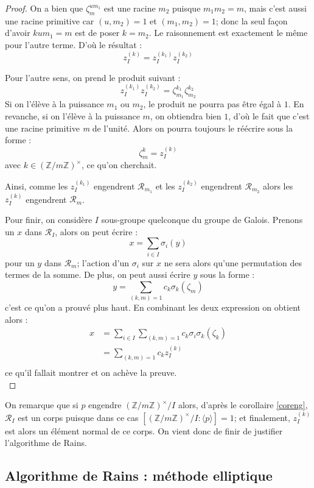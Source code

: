 \documentclass[a4paper]{article} %
\numberwithin{equation}{section}
\newcommand\nroot[1]{\textit{#1}\up{\textit{ième}}}
\newcommand\zmodninv[1]{(\mathbb{Z}/#1\mathbb{Z})^{\times}}
\begin{document}
\begin{proof}
On a bien que $\zeta_m^{um_1}$ est une racine \nroot{$m_2$} puisque $m_1m_2 = m$, mais c'est aussi une racine primitive car $(u,m_2) = 1$ et $(m_1, m_2) = 1$; donc la seul façon d'avoir $kum_1 = m$ est de poser $k = m_2$. Le raisonnement est exactement le même pour l'autre terme. D'où le résultat :
\[z_I^{(k)} = z_I^{(k_1)}z_I^{(k_2)}\]\par
Pour l'autre sens, on prend le produit suivant :
\[z_I^{(k_1)}z_I^{(k_2)} = \zeta_{m_1}^{k_1}\zeta_{m_2}^{k_2}\]
Si on l'élève à la puissance $m_1$ ou $m_2$, le produit ne pourra pas être égal à $1$. En revanche, si on l'élève à la puissance $m$, on obtiendra bien $1$, d'où le fait que c'est une racine primitive \nroot{m} de l'unité. Alors on pourra toujours le réécrire sous la forme : 
\[\zeta_m^k = z_I^{(k)}\]
avec $k\in\zmodninv{m}$, ce qu'on cherchait.\par
Ainsi, comme les $z_I^{(k_1)}$ engendrent $\mathcal{R}_{m_1}$ et les $z_I^{(k_2)}$ engendrent $\mathcal{R}_{m_2}$ alors les $z_I^{(k)}$ engendrent $\mathcal{R}_m$.\\\par
Pour finir, on considère $I$ sous-groupe quelconque du groupe de Galois. Prenons un $x$ dans $\mathcal{R}_I$, alors on peut écrire :
\[x = \sum_{i\in I}{\sigma_i(y)}\]
pour un $y$ dans $\mathcal{R}_m$; l'action d'un $\sigma_i$ sur $x$ ne sera alors qu'une permutation des termes de la somme. De plus, on peut aussi écrire $y$ sous la forme :
\[y = \sum_{(k,m)=1}{c_k\sigma_k(\zeta_m)}\]
c'est ce qu'on a prouvé plus haut. En combinant les deux expression on obtient alors :
\begin{align*}
x &= \sum_{i\in I}{\sum_{(k,m)=1}{c_k\sigma_i\sigma_k(\zeta_k)}}\\
&= \sum_{(k,m)=1}{c_kz_I^{(k)}}\\
\end{align*}
ce qu'il fallait montrer et on achève la preuve.\\
\end{proof}

\begin{rem}
On remarque que si $p$ engendre $\zmodninv{m}/I$ alors, d'après le corollaire \ref{coreng}, $\mathcal{R}_I$ est un corps puisque dans ce cas $[\zmodninv{m}/I:\langle p\rangle] = 1$; et finalement, $z_I^{(k)}$ est alors un élément normal de ce corps. On vient donc de finir de justifier l'algorithme de Rains.
\end{rem}

\subsection{Algorithme de Rains : méthode elliptique}
\end{document}
